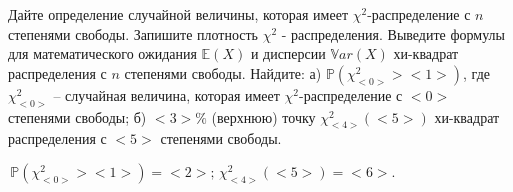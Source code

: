 \documentclass{article}%
\begin{document}
\begin{problem}
Дайте определение случайной величины, которая
имеет $\chi^2$-распределение с $n$
степенями свободы. Запишите плотность
$\chi^2$ - распределения.
Выведите формулы для математического
ожидания $\mathbb E(X)$ и дисперсии
$\mathbb Var(X)$ хи-квадрат распределения с
$n$ степенями свободы. Найдите:
а) $\mathbb P(\chi_{<0>}^2><1>)$, где $\chi_{<0>}^2$ --
случайная величина, которая имеет
$\chi^2$-распределение с $<0>$ степенями свободы;
б) $<3>\%$ (верхнюю) точку $\chi_{<4>}^2(<5>)$
хи-квадрат распределения с $<5>$ степенями свободы.
\end{problem}

\begin{solution*}
$ \,\mathbb P(\chi_{<0>}^2><1>)=<2>;\,
\chi_{<4>}^2(<5>)=<6>.\,$
\end{solution*}
\end{document}
